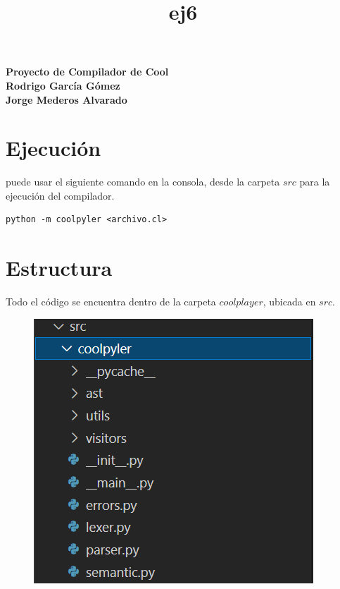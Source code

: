 \documentclass[a4paper,12pt]{article}
\begin{document}
 

\title{ej6}

\begin{titlepage}
\centering
\vspace*{\fill}
\vspace*{0.5cm}
\huge\bfseries
Proyecto de Compilador de Cool\\
\vspace*{0.5cm}
\large Rodrigo García Gómez\\
Jorge Mederos Alvarado
\vspace*{\fill}
\end{titlepage}


\section*{Ejecución}
puede usar el siguiente comando en la consola, desde la carpeta $src$ para la ejecución del compilador.

\begin{lstlisting}
python -m coolpyler <archivo.cl>
\end{lstlisting}


\section*{Estructura}
Todo el código se encuentra dentro de la carpeta $coolplayer$, ubicada en $src$.

\begin{figure}[H]
\centering
\includegraphics[width=0.9\linewidth]{./1}
\caption{}
\label{fig:1}
\end{figure}
\end{document}
